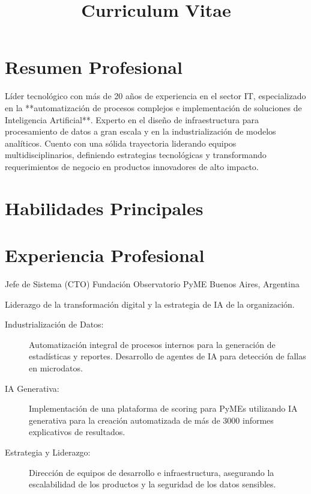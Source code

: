 \documentclass[9pt,a4paper,sans]{moderncv}
\title{Curriculum Vitae}
\begin{document}
\makecvtitle

\section{Resumen Profesional}
Líder tecnológico con más de 20 años de experiencia en el sector IT, especializado en la **automatización de procesos complejos e implementación de soluciones de Inteligencia Artificial**. Experto en el diseño de infraestructura para procesamiento de datos a gran escala y en la industrialización de modelos analíticos. Cuento con una sólida trayectoria liderando equipos multidisciplinarios, definiendo estrategias tecnológicas y transformando requerimientos de negocio en productos innovadores de alto impacto.

\section{Habilidades Principales}

\section{Experiencia Profesional}

	{Jefe de Sistema (CTO)}
	{Fundación Observatorio PyME}
	{Buenos Aires, Argentina}
	{}
	{Liderazgo de la transformación digital y la estrategia de IA de la organización.
	\begin{description}
		\item[Industrialización de Datos:] Automatización integral de procesos internos para la generación de estadísticas y reportes. Desarrollo de agentes de IA para detección de fallas en microdatos.
		\item[IA Generativa:] Implementación de una plataforma de scoring para PyMEs utilizando IA generativa para la creación automatizada de más de 3000 informes explicativos de resultados.
		\item[Estrategia y Liderazgo:] Dirección de equipos de desarrollo e infraestructura, asegurando la escalabilidad de los productos y la seguridad de los datos sensibles.
	\end{description}}
\end{document}
